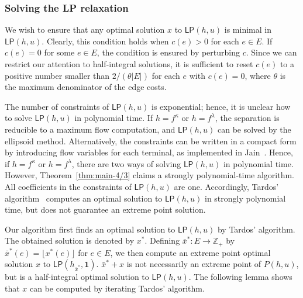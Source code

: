 \documentclass{article}
\newcommand{\Zset}{\mathbb{Z}}
\newcommand{\allone}{\mathbf{1}}
\newcommand{\cut}{P}
\newcommand{\lp}{\mathsf{LP}}
\newcommand{\f}{f^{\kappa}}
\newcommand{\g}{f^{\lambda}}
\begin{document}
\subsubsection*{Solving the LP relaxation}
We wish to ensure that any optimal solution $x$ to $\lp(h,u)$ 
is minimal in $\lp(h,u)$. Clearly, this condition holds when $c(e) > 0$ for each $e \in E$.
If $c(e)=0$ for some $e \in E$, the condition is ensured by perturbing $c$.
Since we can restrict our attention to half-integral solutions,
it is sufficient to reset $c(e)$ 
to a positive number smaller than $2/(\theta|E|)$ for each $e$ with $c(e)=0$,
where $\theta$ is the maximum denominator of the edge costs.

The number of constraints of $\lp(h,u)$ is exponential;
hence, it is unclear how to solve $\lp(h,u)$ in polynomial time.
If $h=\f$ or $h=\g$,
the separation is reducible to
a maximum flow computation, and $\lp(h,u)$ can be solved by the ellipsoid method.
Alternatively, the constraints can be written in a compact form by introducing flow variables for
each terminal, as implemented in Jain~\cite{Jain01}.
Hence, if $h=\f$ or $h=\g$, there are two ways of solving
$\lp(h,u)$ in polynomial time.
However, Theorem~\ref{thm:main-4/3} claims a strongly polynomial-time algorithm.
All coefficients in the constraints of $\lp(h,u)$ are one. Accordingly, 
Tardos' algorithm~\cite{Tardos1986} computes
an optimal solution to $\lp(h,u)$ in strongly polynomial time,
but does not guarantee an extreme point solution.

Our algorithm first finds an optimal solution to $\lp(h,u)$ by Tardos' algorithm.
The obtained solution is denoted by $x^*$.
Defining $\bar{x}^*\colon E \rightarrow \Zset_+$ by $\bar{x}^*(e)=\lfloor x^*(e)\rfloor$ for $e \in
E$, we then compute an extreme point optimal solution $x$ to $\lp(h_{\bar{x}^*},\allone)$.
$\bar{x}^* + x$ is not necessarily an extreme point of $\cut(h,u)$,
but is a half-integral optimal solution to $\lp(h,u)$.
The following lemma shows that 
$x$ can be computed by iterating Tardos' algorithm.
\end{document}
